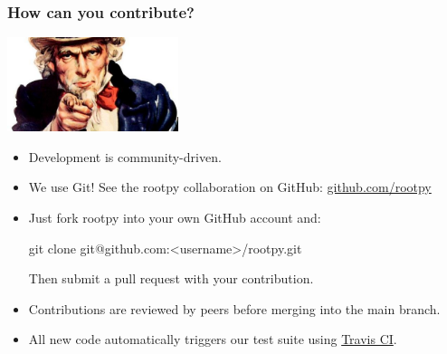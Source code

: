 \documentclass[10pt,professionalfonts,serif,usenames,dvipsnames,svgnames,table]{beamer}
\begin{document}
\begin{frame}[fragile]
    \frametitle{How can you contribute?}

    \begin{center}
    \includegraphics[width=5cm]{figs/we-want-you.jpg}
    \end{center}

    \begin{itemize}
        \item Development is community-driven.
        \item We use Git! See the rootpy collaboration on GitHub:
            \href{https://github.com/rootpy}{github.com/rootpy}
        \item Just fork rootpy into your own GitHub account and:
            \begin{pyglist}[language=bash,texcl=true,style=vim]
git clone git@github.com:<username>/rootpy.git
            \end{pyglist}
              Then submit a pull request with your contribution.
        \item Contributions are reviewed by peers before merging into the main branch.
        \item All new code automatically triggers our test suite using
            \href{https://travis-ci.org/}{Travis CI}.
    \end{itemize}
\end{frame}
\end{document}
